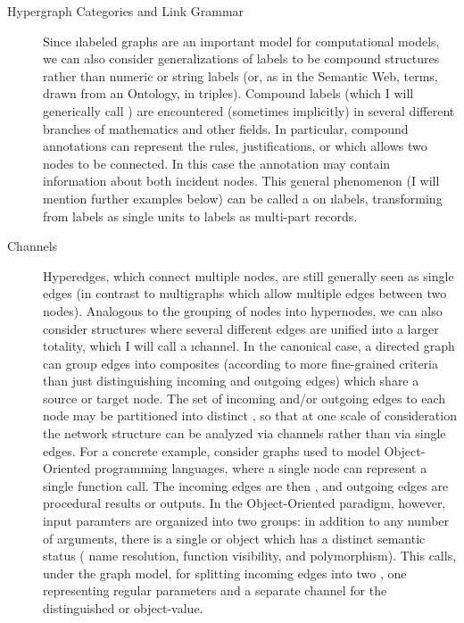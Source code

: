 {\begin{description}
\item[Hypergraph Categories and Link Grammar]   Since \i{labeled} 
graphs are an important model for computational models, 
we can also consider generalizations of labels to be 
compound structures rather than numeric or string labels 
(or, as in the Semantic Web,  terms,  
drawn from an Ontology, in  
triples).  Compound labels (which I will generically call 
) are encountered (sometimes implicitly) 
in several different branches of mathematics and other fields.  
In particular, compound annotations can represent the 
rules, justifications, or  which allows 
two nodes to be connected.   In this case the annotation 
may contain information about both incident nodes.  
This general phenomenon (I will mention further examples 
below) can be called a  
on \i{labels}, transforming from labels as single units 
to labels as multi-part records.
\item[Channels]   Hyperedges, which connect multiple 
nodes, are still generally seen as single edges 
(in contrast to multigraphs which allow multiple 
edges between two nodes).  Analogous to the grouping 
of nodes into hypernodes, we can also consider structures 
where several different edges are unified into a larger 
totality, which I will call a \i{channel}.  
In the canonical case, a directed graph can group 
edges into composites (according to more fine-grained criteria 
than just distinguishing incoming and outgoing edges) which share a 
source or target node.  The set of incoming and/or outgoing  edges 
to each node may be partitioned into distinct 
, so that at one scale of consideration the network 
structure can be analyzed via channels rather than via 
single edges.  For a concrete example, 
consider graphs used to model Object-Oriented programming 
languages, where a single node can represent a 
single function call.  The incoming edges are then 
, and outgoing edges are procedural 
results or outputs.  In the Object-Oriented paradigm, however, 
input paramters are organized into two groups: in addition 
to any number of  arguments, there is 
a single \this{} or \self{} object which has a distinct  semantic 
status (\visavis{} name resolution, function visibility, and 
polymorphism).  This calls, under the graph model, for splitting 
incoming edges into two , one representing regular 
parameters and a separate channel for the distinguished or 
 object-value.
\end{description}
}
